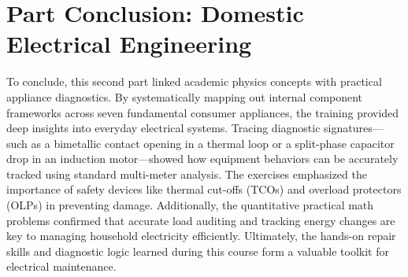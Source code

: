 \documentclass[11pt,a4paper]{report}
\begin{document}
\chapter*{Part Conclusion: Domestic Electrical Engineering}
To conclude, this second part linked academic physics concepts with practical appliance diagnostics. By systematically mapping out internal component frameworks across seven fundamental consumer appliances, the training provided deep insights into everyday electrical systems. Tracing diagnostic signatures—such as a bimetallic contact opening in a thermal loop or a split-phase capacitor drop in an induction motor—showed how equipment behaviors can be accurately tracked using standard multi-meter analysis. The exercises emphasized the importance of safety devices like thermal cut-offs (TCOs) and overload protectors (OLPs) in preventing damage. Additionally, the quantitative practical math problems confirmed that accurate load auditing and tracking energy changes are key to managing household electricity efficiently. Ultimately, the hands-on repair skills and diagnostic logic learned during this course form a valuable toolkit for electrical maintenance.
\end{document}
